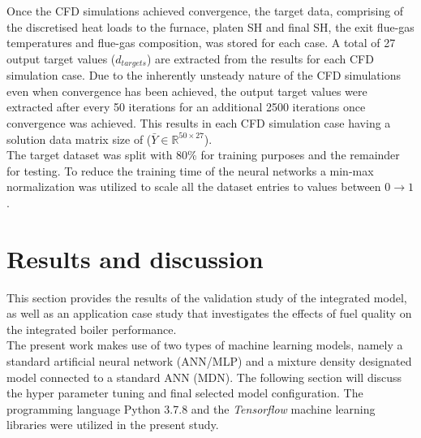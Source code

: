 \documentclass[a4paper,fleqn]{cas-sc}
\begin{document}
Once the CFD simulations achieved convergence, the target data, comprising of the discretised heat loads to the furnace, platen SH and final SH, the exit flue-gas temperatures and flue-gas composition, was stored for each case. A total of 27 output target values ($d_{targets}$) are extracted from the results for each CFD simulation case. Due to the inherently unsteady nature of the CFD simulations even when convergence has been achieved, the output target values were extracted after every 50 iterations for an additional 2500 iterations once convergence was achieved. This results in each CFD simulation case having a solution data matrix size of ($\bar{Y}\in \mathbb{R}^{50\times27}$).\\

The target dataset was split with 80\% for training purposes and the remainder for testing. To reduce the training time of the neural networks a min-max normalization was utilized to scale all the dataset entries to values between $0\rightarrow1$.
\section{Results and discussion}\label{sec_results_diss}
This section provides the results of the validation study of the integrated model, as well as an application case study that investigates the effects of fuel quality on the integrated boiler performance.\\


The present work makes use of two types of machine learning models, namely a standard artificial neural network (ANN/MLP) and a mixture density designated model connected to a standard ANN (MDN). The following section will discuss the hyper parameter tuning and final selected model configuration. The programming language Python 3.7.8 and the \textit{Tensorflow} machine learning libraries were utilized in the present study.
\end{document}
